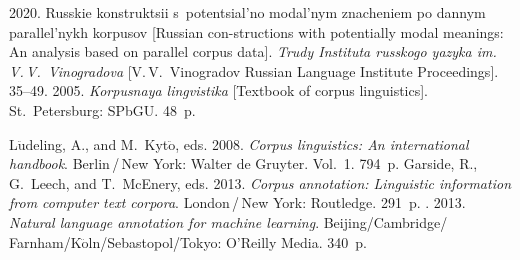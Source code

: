 \begin{multicols}{2}
{{\begin{thebibliography}{99}
{}
 2020. Russkie konstruktsii s~potentsial'no 
modal'nym znacheniem po dannym parallel'nykh korpusov [Russian con-structions with potentially 
modal meanings: An analysis based on parallel corpus data]. \textit{Trudy Instituta russkogo 
yazyka im. V.\,V.~Vinogradova} [V.\,V.~Vinogradov Russian Language Institute Proceedings]. 
35--49.
 2005. \textit{Korpusnaya lingvistika} [Textbook of corpus linguistics]. 
St.\ Petersburg: SPbGU. 48~p.

\pagebreak

L$\ddot{\mbox{u}}$deling, A., and M.~Kyt$\ddot{\mbox{o}}$, eds. 2008. \textit{Corpus 
linguistics: An international handbook}. Berlin\,/\,New York: Walter de Gruyter. Vol.~1. 794~p.
Garside, R., G.~Leech, and T.~McEnery, eds. 2013. \textit{Corpus annotation: Linguistic 
information from computer text corpora}. London\,/\,New York: Routledge. 291~p.
. 2013. \textit{Natural language annotation for machine 
learning}. Beijing/Cambridge/ Farnham/K$\ddot{\mbox{o}}$ln/Sebastopol/Tokyo: O'Reilly Media. 340~p.


\end{thebibliography}}}
\end{multicols}
